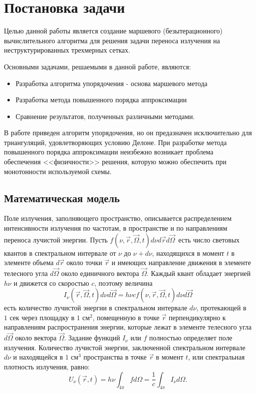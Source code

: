 \chapter{Постановка задачи}
Целью  данной работы является создание маршевого (безытерационного) вычислительного алгоритма для решения задачи переноса излучения на неструктурированных трехмерных сетках. 

Основными задачами, решаемыми в данной работе, являются:
\begin{itemize}
\item Разработка алгоритма упорядочения - основа маршевого метода
\item Разработка метода повышенного порядка аппроксимации
\item Сравнение результатов, полученных различными методами.
\end{itemize}

В работе \cite{skalko_2014} приведен алгоритм упорядочения, но он предазначен исключительно для триангуляций, удовлетворяющих условию Делоне. При разработке метода повышенного порядка аппроксимации неизбежно возникает проблема обеспечения <<физичности>> решения, которую можно обеспечить при монотонности используемой схемы.
\section{Математическая модель}
Поле излучения, заполняющего пространство, описывается распределением интенсивности излучения по частотам, в пространстве и по направлениям переноса лучистой энергии. Пусть $f(\nu, \vec r, \vec \Omega, t)d\nu d\vec r d \vec \Omega \, $ есть число световых квантов в спектральном интервале от $ \nu$ до $ \nu + d\nu$, находящихся в момент $t$ в элементе объема $d\vec r$ около точки $\vec r$ и имеющих направление движения в элементе телесного угла $d\vec \Omega$ около единичного вектора $\vec \Omega$. 
Каждый квант обладает энергией $h \nu$ и движется со скоростью $c$, поэтому величина 
\begin {equation}
I_{\nu} (\vec r, \vec \Omega, t)d \nu d\vec \Omega = h\nu c f (\nu, \vec r, \vec \Omega, t)d\nu d\vec{\Omega}
\end {equation}
есть количество лучистой энергии в спектральном интервале $d\nu$, протекающей в $1 \text{ сек}$ через площадку в $1 \text{ см}^2$, помещенную в точке $\vec r$ перпендикулярно к направлениям распространения энергии, которые лежат в элементе телесного угла $d\vec\Omega$ около вектора $\vec \Omega$. Задание функций $I_{\nu}$ или $f$ полностью определяет поле излучения. Количество лучистой энергии, заключенной  спектральном интервале $d\nu$ и находящейся в $1 \text{ см}^3$ пространства в точке $\vec r$ в момент $t$, или спектральная плотность излучения, равно:
\begin {equation}
U_\nu (\vec r, t) = h \nu \int_{4 \pi} f d \Omega = \frac{1}{c} \int_{4\pi} I_{\nu} d\Omega.
\end {equation}

